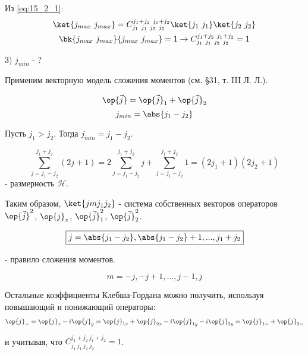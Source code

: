 Из \eqref{eq:15_2_1}:
\begin{gather*}
\ket{j_{max}~j_{max}} = C^{j_1+j_2~j_1 + j_2}_{j_1~j_1~j_2~j_2} \ket{j_1~j_1}\ket{j_2~j_2} \\
\bk{j_{max}~j_{max}}{j_{max}~j_{max}} = 1 \to C^{j_1+j_2~j_1 + j_2}_{j_1~j_1~j_2~j_2} = 1
\end{gather*} 

3) $j_{min}$ - ?

Применим векторную модель сложения моментов (см. \S 31, т. III Л. Л.).

$$
\op{\vec{j}} = \op{\vec{j}}_1 + \op{\vec{j}}_2
$$
$$
j_{min} = \abs{j_1 - j_2}
$$

Пусть $j_1 > j_2$. Тогда $j_{min} = j_1 - j_2$.

$$
\sum_{j = j_1 - j_2}^{j_1 + j_2} (2j + 1) = 2 \sum_{j = j_1 - j_2}^{j_1 + j_2} j + \sum_{j = j_1 - j_2}^{j_1 + j_2} 1 = (2j_1 + 1)(2j_2 + 1)
$$
 - размерность $\mathcal{H}$. 
 
Таким образом, $\ket{j m j_1 j_2}$ - система собственных векторов операторов $\op{\vec{j}}^2$, $\op{j}_z$, $\op{\vec{j}}_1^2$, $\op{\vec{j}}_2^2$. 

\begin{equation}
\label{eq:15_2_4}
\boxed{j = \abs{j_1 - j_2}, \abs{j_1 - j_2} + 1, ..., j_1 + j_2}
\end{equation}

- правило сложения моментов.

$$
m = -j, -j + 1, ..., j -1, j
$$

Остальные коэффициенты Клебша-Гордана можно получить, используя повышающий и понижающий операторы:
\begin{gather*}
\op{j}_- = \op{j}_x - i \op{j}_y = \op{j}_{1x} + \op{j}_{2x} - i \op{j}_{1y} -i\op{j}_{2y} = \op{j}_{1-} + \op{j}_{2-}
\end{gather*}

и учитывая, что $C^{j_1+j_2~j_1 + j_2}_{j_1~j_1~j_2~j_2} = 1$.
